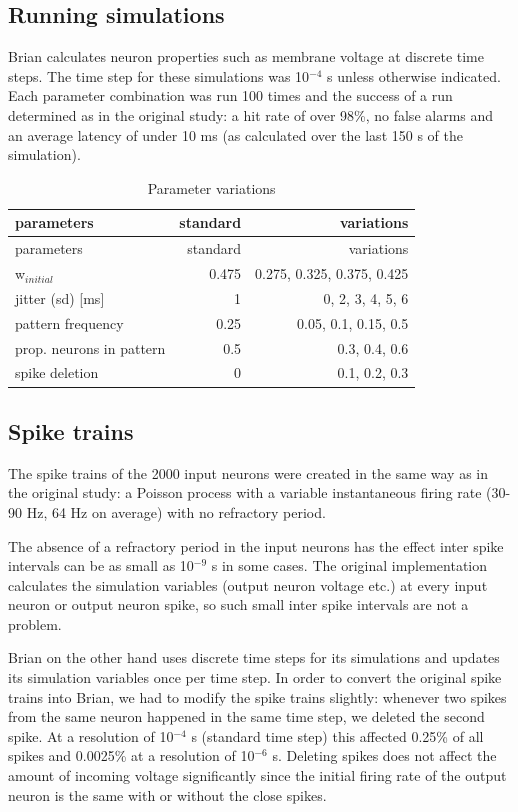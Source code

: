 \documentclass[10pt,a4paper,onecolumn]{article}
\begin{document}
\subsection{Running simulations}\label{running-simulations}

Brian calculates neuron properties such as membrane voltage at discrete
time steps. The time step for these simulations was 10\(^{-4}\) s unless
otherwise indicated. Each parameter combination was run 100 times and
the success of a run determined as in the original study: a hit rate of
over 98\%, no false alarms and an average latency of under 10 ms (as
calculated over the last 150 s of the simulation).

\hypertarget{tbl:param}{}
\begin{longtable}[]{@{}lrr@{}}
\caption{\label{tbl:param}Parameter variations}\tabularnewline
\toprule
parameters & standard & variations\tabularnewline
\midrule
\endfirsthead
\toprule
parameters & standard & variations\tabularnewline
\midrule
\endhead
w\(_{initial}\) & 0.475 & 0.275, 0.325, 0.375, 0.425\tabularnewline
jitter (sd) {[}ms{]} & 1 & 0, 2, 3, 4, 5, 6\tabularnewline
pattern frequency & 0.25 & 0.05, 0.1, 0.15, 0.5\tabularnewline
prop. neurons in pattern & 0.5 & 0.3, 0.4, 0.6\tabularnewline
spike deletion & 0 & 0.1, 0.2, 0.3\tabularnewline
\bottomrule
\end{longtable}

\subsection{Spike trains}\label{spike-trains}

The spike trains of the 2000 input neurons were created in the same way
as in the original study: a Poisson process with a variable
instantaneous firing rate (30-90 Hz, 64 Hz on average) with no
refractory period.

The absence of a refractory period in the input neurons has the effect
inter spike intervals can be as small as 10\(^{-9}\) s in some cases.
The original implementation calculates the simulation variables (output
neuron voltage etc.) at every input neuron or output neuron spike, so
such small inter spike intervals are not a problem.

Brian on the other hand uses discrete time steps for its simulations and
updates its simulation variables once per time step. In order to convert
the original spike trains into Brian, we had to modify the spike trains
slightly: whenever two spikes from the same neuron happened in the same
time step, we deleted the second spike. At a resolution of 10\(^{-4}\) s
(standard time step) this affected 0.25\% of all spikes and 0.0025\% at
a resolution of 10\(^{-6}\) s. Deleting spikes does not affect the
amount of incoming voltage significantly since the initial firing rate
of the output neuron is the same with or without the close spikes.
\end{document}
